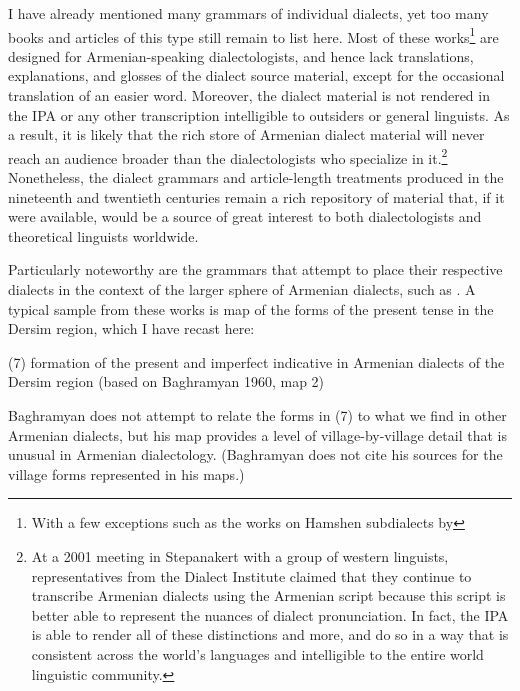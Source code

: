 
I have already mentioned many grammars of individual dialects, yet too many books and articles of this type still remain to list here. Most of these works\footnote{With a few exceptions such as the works on Hamshen subdialects by } are designed for Armenian-speaking dialectologists, and hence lack translations, explanations, and glosses of the dialect source material, except for the occasional translation of an easier word. Moreover, the dialect material is not rendered in the IPA or any other transcription intelligible to outsiders or general linguists. As a result, it is likely that the rich store of Armenian dialect material will never reach an audience broader than the dialectologists who specialize in it.\footnote{At a 2001 meeting in Stepanakert with a group of western linguists, representatives from the Dialect Institute claimed that they continue to transcribe Armenian dialects using the Armenian script because this script is better able to represent the nuances of dialect pronunciation. In fact, the IPA is able to render all of these distinctions and more, and do so in a way that is consistent across the world’s languages and intelligible to the entire world linguistic community.}  Nonetheless, the dialect grammars and article-length treatments produced in the nineteenth and twentieth centuries remain a rich repository of material that, if it were available, would be a source of great interest to both dialectologists and theoretical linguists worldwide.


Particularly noteworthy are the grammars that attempt to place their respective dialects in the context of the larger sphere of Armenian dialects, such as . A typical sample from these works is map of the forms of the present tense in the Dersim region, which I have recast here:


\begin{exe}
	
	(7) formation of the present and imperfect indicative in Armenian dialects of the Dersim region (based on Baghramyan 1960, map 2)
\end{exe}

Baghramyan does not attempt to relate the forms in (7) to what we find in other Armenian dialects, but his map provides a level of village-by-village detail that is unusual in Armenian dialectology. (Baghramyan does not cite his sources for the village forms represented in his maps.)

